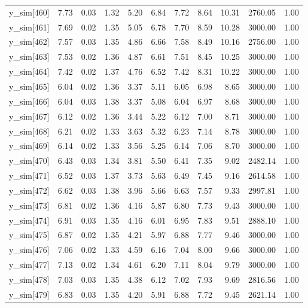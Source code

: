 \begin{table}[ht]
\begin{tabular}{rrrrrrrrrrr}
  y\_sim[460] & 7.73 & 0.03 & 1.32 & 5.20 & 6.84 & 7.72 & 8.64 & 10.31 & 2760.05 & 1.00 \\ 
  y\_sim[461] & 7.69 & 0.02 & 1.35 & 5.05 & 6.78 & 7.70 & 8.59 & 10.28 & 3000.00 & 1.00 \\ 
  y\_sim[462] & 7.57 & 0.03 & 1.35 & 4.86 & 6.66 & 7.58 & 8.49 & 10.16 & 2756.00 & 1.00 \\ 
  y\_sim[463] & 7.53 & 0.02 & 1.36 & 4.87 & 6.61 & 7.51 & 8.45 & 10.25 & 3000.00 & 1.00 \\ 
  y\_sim[464] & 7.42 & 0.02 & 1.37 & 4.76 & 6.52 & 7.42 & 8.31 & 10.22 & 3000.00 & 1.00 \\ 
  y\_sim[465] & 6.04 & 0.02 & 1.36 & 3.37 & 5.11 & 6.05 & 6.98 & 8.65 & 3000.00 & 1.00 \\ 
  y\_sim[466] & 6.04 & 0.03 & 1.38 & 3.37 & 5.08 & 6.04 & 6.97 & 8.68 & 3000.00 & 1.00 \\ 
  y\_sim[467] & 6.12 & 0.02 & 1.36 & 3.44 & 5.22 & 6.12 & 7.00 & 8.71 & 3000.00 & 1.00 \\ 
  y\_sim[468] & 6.21 & 0.02 & 1.33 & 3.63 & 5.32 & 6.23 & 7.14 & 8.78 & 3000.00 & 1.00 \\ 
  y\_sim[469] & 6.14 & 0.02 & 1.33 & 3.56 & 5.25 & 6.14 & 7.06 & 8.70 & 3000.00 & 1.00 \\ 
  y\_sim[470] & 6.43 & 0.03 & 1.34 & 3.81 & 5.50 & 6.41 & 7.35 & 9.02 & 2482.14 & 1.00 \\ 
  y\_sim[471] & 6.52 & 0.03 & 1.37 & 3.73 & 5.63 & 6.49 & 7.45 & 9.16 & 2614.58 & 1.00 \\ 
  y\_sim[472] & 6.62 & 0.03 & 1.38 & 3.96 & 5.66 & 6.63 & 7.57 & 9.33 & 2997.81 & 1.00 \\ 
  y\_sim[473] & 6.81 & 0.02 & 1.36 & 4.16 & 5.87 & 6.80 & 7.73 & 9.43 & 3000.00 & 1.00 \\ 
  y\_sim[474] & 6.91 & 0.03 & 1.35 & 4.16 & 6.01 & 6.95 & 7.83 & 9.51 & 2888.10 & 1.00 \\ 
  y\_sim[475] & 6.87 & 0.02 & 1.35 & 4.21 & 5.97 & 6.88 & 7.77 & 9.46 & 3000.00 & 1.00 \\ 
  y\_sim[476] & 7.06 & 0.02 & 1.33 & 4.59 & 6.16 & 7.04 & 8.00 & 9.66 & 3000.00 & 1.00 \\ 
  y\_sim[477] & 7.13 & 0.02 & 1.34 & 4.61 & 6.20 & 7.11 & 8.04 & 9.79 & 3000.00 & 1.00 \\ 
  y\_sim[478] & 7.03 & 0.03 & 1.35 & 4.38 & 6.12 & 7.02 & 7.93 & 9.69 & 2816.56 & 1.00 \\ 
  y\_sim[479] & 6.83 & 0.03 & 1.35 & 4.20 & 5.91 & 6.88 & 7.72 & 9.45 & 2621.14 & 1.00 \\ 

\end{tabular}
\end{table}
